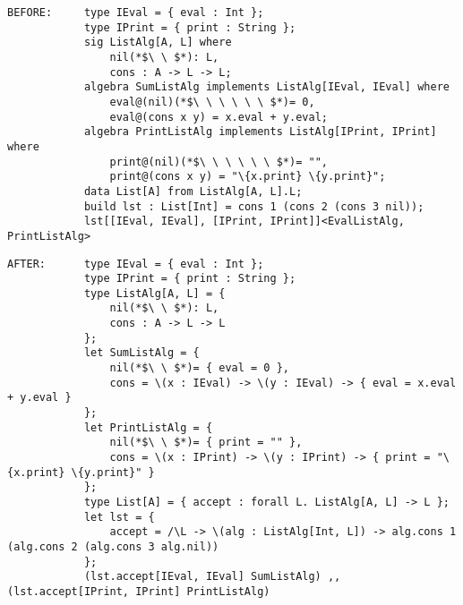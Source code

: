 \documentclass{article}
\begin{document}
\begin{spacing}{1.1}
\begin{lstlisting}[numbers=none]
BEFORE:     type IEval = { eval : Int };
            type IPrint = { print : String };
            sig ListAlg[A, L] where
                nil(*$\ \ $*): L,
                cons : A -> L -> L;
            algebra SumListAlg implements ListAlg[IEval, IEval] where
                eval@(nil)(*$\ \ \ \ \ \ $*)= 0,
                eval@(cons x y) = x.eval + y.eval;
            algebra PrintListAlg implements ListAlg[IPrint, IPrint] where
                print@(nil)(*$\ \ \ \ \ \ $*)= "",
                print@(cons x y) = "\{x.print} \{y.print}";
            data List[A] from ListAlg[A, L].L;
            build lst : List[Int] = cons 1 (cons 2 (cons 3 nil));
            lst[[IEval, IEval], [IPrint, IPrint]]<EvalListAlg, PrintListAlg>
\end{lstlisting}
\begin{lstlisting}[numbers=none]
AFTER:      type IEval = { eval : Int };
            type IPrint = { print : String };
            type ListAlg[A, L] = {
                nil(*$\ \ $*): L,
                cons : A -> L -> L
            };
            let SumListAlg = {
                nil(*$\ \ $*)= { eval = 0 },
                cons = \(x : IEval) -> \(y : IEval) -> { eval = x.eval + y.eval }
            };
            let PrintListAlg = {
                nil(*$\ \ $*)= { print = "" },
                cons = \(x : IPrint) -> \(y : IPrint) -> { print = "\{x.print} \{y.print}" }
            };
            type List[A] = { accept : forall L. ListAlg[A, L] -> L };
            let lst = {
                accept = /\L -> \(alg : ListAlg[Int, L]) -> alg.cons 1 (alg.cons 2 (alg.cons 3 alg.nil))
            };
            (lst.accept[IEval, IEval] SumListAlg) ,, (lst.accept[IPrint, IPrint] PrintListAlg)
\end{lstlisting}



\end{spacing}
\end{document}
